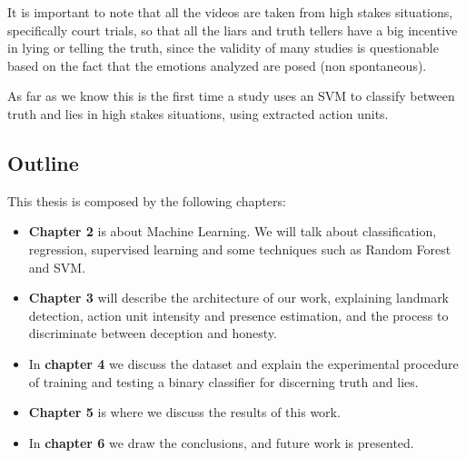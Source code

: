It is important to note that all the videos are taken from high stakes situations, specifically court trials, so that all the liars and truth tellers have a big incentive in lying or telling the truth, since the validity of many studies is questionable based on the fact that the emotions analyzed are posed (non spontaneous). 

As far as we know this is the first time a study uses an SVM to classify between truth and lies in high stakes situations, using extracted action units.

\subsection{Outline}
This thesis is composed by the following chapters:

\begin{itemize}
	\item \textbf{Chapter 2} is about Machine Learning. We will talk about classification, regression, supervised learning and some techniques such as Random Forest and SVM.
	\item \textbf{Chapter 3} will describe the architecture of our work, explaining landmark detection, action unit intensity and presence estimation, and the process to discriminate between deception and honesty.
	\item In \textbf{chapter 4} we discuss the dataset and explain the experimental procedure of training and testing a binary classifier for discerning truth and lies.
	\item \textbf{Chapter 5} is where we discuss the results of this work.
	\item In \textbf{chapter 6} we draw the conclusions, and future work is presented. 
\end{itemize}
